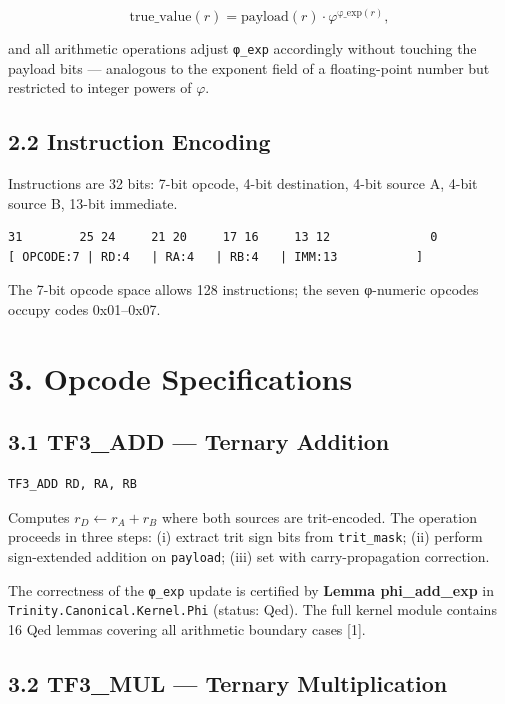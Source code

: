 \[\text{true\_value}(r) = \text{payload}(r) \cdot \varphi^{\text{φ\_exp}(r)},\]

and all arithmetic operations adjust
\texttt{φ\_exp} accordingly without touching the
payload bits --- analogous to the exponent field
of a floating-point number but restricted to
integer powers of \(\varphi\).

\subsection{2.2 Instruction
Encoding}\label{fa_26:instruction-encoding}

Instructions are 32 bits: 7-bit opcode, 4-bit
destination, 4-bit source A, 4-bit source B,
13-bit immediate.

\begin{verbatim}
31        25 24     21 20     17 16     13 12              0
[ OPCODE:7 | RD:4   | RA:4   | RB:4   | IMM:13           ]
\end{verbatim}

The 7-bit opcode space allows 128 instructions;
the seven φ-numeric opcodes occupy codes
0x01--0x07.

\section{3. Opcode
Specifications}\label{fa_26:opcode-specifications}

\subsection{3.1 TF3\_ADD --- Ternary
Addition}\label{fa_26:tf3_add-ternary-addition}

\begin{verbatim}
TF3_ADD RD, RA, RB
\end{verbatim}

Computes \(r_D \leftarrow r_A + r_B\) where both
sources are trit-encoded. The operation proceeds
in three steps: (i) extract trit sign bits from
\texttt{trit\_mask}; (ii) perform sign-extended
addition on \texttt{payload}; (iii) set
with carry-propagation correction.

The correctness of the \texttt{φ\_exp} update is
certified by \textbf{Lemma phi\_add\_exp} in
\texttt{Trinity.Canonical.Kernel.Phi} (status:
Qed). The full kernel module contains 16 Qed
lemmas covering all arithmetic boundary cases
[1].

\subsection{3.2 TF3\_MUL --- Ternary
Multiplication}\label{fa_26:tf3_mul-ternary-multiplication}

